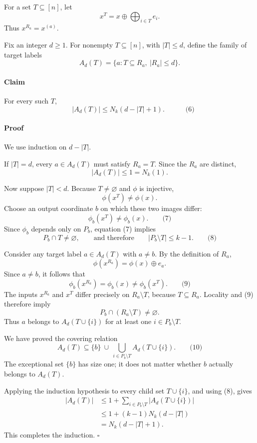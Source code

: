\documentclass[
  11pt,
  a4paper,
]{article}
\newcounter{none} %
\begin{document}
For a set \(T\subseteq[n]\), let \[
x^T=x\oplus\bigoplus_{i\in T}e_i.
\] Thus \(x^{R_a}=x^{(a)}\).

Fix an integer \(d\ge1\). For nonempty \(T\subseteq[n]\), with
\(|T|\le d\), define the family of target labels \[
A_d(T)=\{a:T\subseteq R_a,\ |R_a|\le d\}.
\]

\paragraph{Claim}\label{claim}

For every such \(T\), \[
\boxed{\quad
|A_d(T)|\le N_k(d-|T|+1).
\quad}                                                \qquad\text{(6)}
\]

\paragraph{Proof}\label{proof}

We use induction on \(d-|T|\).

If \(|T|=d\), every \(a\in A_d(T)\) must satisfy \(R_a=T\). Since the
\(R_a\) are distinct, \[
|A_d(T)|\le1=N_k(1).
\]

Now suppose \(|T|<d\). Because \(T\ne\varnothing\) and \(\phi\) is
injective, \[
\phi(x^T)\ne\phi(x).
\] Choose an output coordinate \(b\) on which these two images differ:
\[
\phi_b(x^T)\ne\phi_b(x).                              \qquad\text{(7)}
\] Since \(\phi_b\) depends only on \(P_b\), equation (7) implies \[
P_b\cap T\ne\varnothing,
\qquad\text{and therefore}\qquad
|P_b\setminus T|\le k-1.                              \qquad\text{(8)}
\]

Consider any target label \(a\in A_d(T)\) with \(a\ne b\). By the
definition of \(R_a\), \[
\phi(x^{R_a})=\phi(x)\oplus e_a.
\] Since \(a\ne b\), it follows that \[
\phi_b(x^{R_a})=\phi_b(x)\ne\phi_b(x^T).              \qquad\text{(9)}
\] The inputs \(x^{R_a}\) and \(x^T\) differ precisely on
\(R_a\setminus T\), because \(T\subseteq R_a\). Locality and (9)
therefore imply \[
P_b\cap(R_a\setminus T)\ne\varnothing.
\] Thus \(a\) belongs to \(A_d(T\cup\{i\})\) for at least one
\(i\in P_b\setminus T\).

We have proved the covering relation \[
A_d(T)
\subseteq
\{b\}\ \cup\
\bigcup_{i\in P_b\setminus T}A_d(T\cup\{i\}).         \qquad\text{(10)}
\] The exceptional set \(\{b\}\) has size one; it does not matter
whether \(b\) actually belongs to \(A_d(T)\).

Applying the induction hypothesis to every child set \(T\cup\{i\}\), and
using (8), gives \begin{equation*}
\begin{aligned}
|A_d(T)|
&\le 1+\sum_{i\in P_b\setminus T}|A_d(T\cup\{i\})|\\
&\le 1+(k-1)N_k(d-|T|)\\
&=N_k(d-|T|+1).
\end{aligned}
\end{equation*} This completes the induction. \(\square\)
\end{document}
